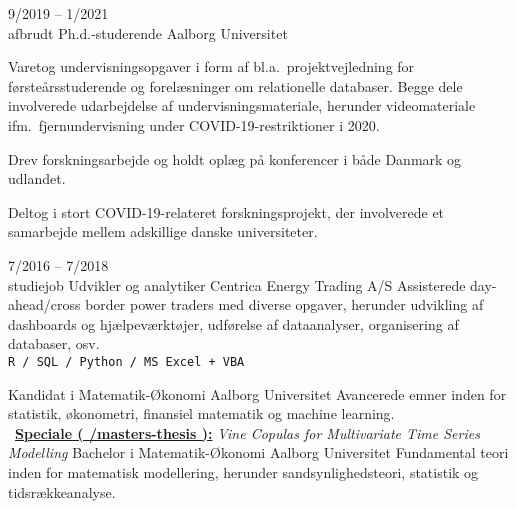 \documentclass[9pt]{template/developercv}
\newcommand{\link}[2]{\faLink~\href{#1}{\textbf{#2}}}
\begin{document}
\begin{entrylist}
  \entry
  {9/2019 -- 1/2021\\{\footnotesize afbrudt}}
  {Ph.d.-studerende}
  {Aalborg Universitet}
  {
    Varetog undervisningsopgaver i form af bl.a.\ projektvejledning for førsteårsstuderende og forelæsninger om relationelle databaser.
    Begge dele involverede udarbejdelse af undervisningsmateriale, herunder videomateriale ifm.\ fjernundervisning under COVID-19-restriktioner i 2020.

    Drev forskningsarbejde og holdt oplæg på konferencer i både Danmark og udlandet.

    Deltog i stort COVID-19-relateret forskningsprojekt, der involverede et samarbejde mellem adskillige danske universiteter.
  }

  \entry
  {7/2016 -- 7/2018\\{\footnotesize studiejob}}
  {Udvikler og analytiker}
  {Centrica Energy Trading A/S}
  {
    Assisterede day-ahead/cross border power traders med diverse opgaver, herunder udvikling af dashboards og hjælpeværktøjer, udførelse af dataanalyser, organisering af databaser, osv.
    \\
    \texttt{R / SQL / Python / MS Excel + VBA}
  }
\end{entrylist}

\begin{entrylist}
   {Kandidat i Matematik-Økonomi} {Aalborg Universitet} {
    Avancerede emner inden for statistik, økonometri, finansiel matematik og machine learning.\\
    \link{https://github.com/janusvm/masters-thesis}{Speciale ( \faGithub/masters-thesis ):}
    \emph{Vine Copulas for Multivariate Time Series Modelling}%
  }
   {Bachelor i Matematik-Økonomi} {Aalborg Universitet} {
    Fundamental teori inden for matematisk modellering, herunder sandsynlighedsteori, statistik og tidsrækkeanalyse.
  }
\end{entrylist}
\end{document}
